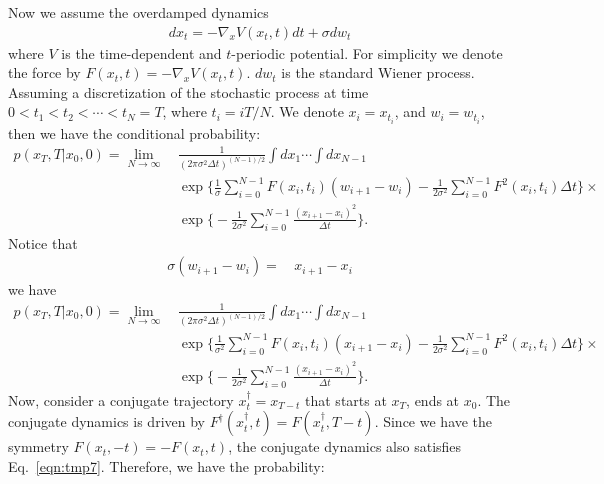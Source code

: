 \documentclass[preprint,unsortedaddress,a4paper,onecolumn]{revtex4-1}
\newcommand{\dt}[0]{\Delta t}
\begin{document}
Now we assume the overdamped dynamics
\begin{align}\label{eqn:tmp7}
  dx_t = -\nabla_x V(x_t,t) dt + \sigma dw_t
\end{align}
where $V$ is the time-dependent and $t$-periodic potential. For simplicity we denote the force by $F(x_t,t) = -\nabla_x V(x_t, t)$. $dw_t$ is
the standard Wiener process.  Assuming a discretization of the
stochastic process at time $0 < t_1 < t_2 < \cdots < t_N = T$, where
$t_i = iT / N$. We denote $x_i = x_{t_i}$, and $w_i = w_{t_i}$, then we have the
conditional probability:
\begin{align}\nonumber
  p(x_T,T\vert x_0,0) =\lim_{N\rightarrow\infty} &\,
  \frac{1}{(2\pi\sigma^2\dt)^{(N-1)/2}} \int dx_1\cdots\int dx_{N-1}\\\nonumber
  &\,
  \exp\bigg\{\frac1\sigma\sum_{i=0}^{N-1} F(x_i,t_i)(w_{i+1} - w_{i}) - \frac1{2\sigma^2}\sum_{i=0}^{N-1}F^2(x_i,t_i)\dt\bigg\} \times\\\label{eqn:tmp8}
  &\,
  \exp\bigg\{- \frac1{2\sigma^2} \sum_{i=0}^{N-1} \frac{(x_{i+1} - x_i)^2}{\dt}\bigg\}.
\end{align}
Notice that
\begin{align}\label{eqn:tmp10}
  \sigma(w_{i+1} - w_{i}) =
  &\,
  x_{i+1} - x_i 
\end{align}
we have
\begin{align}\nonumber
  p(x_T,T\vert x_0,0)
  =\lim_{N\rightarrow\infty} &\,
  \frac{1}{(2\pi\sigma^2\dt)^{(N-1)/2}} \int dx_1\cdots\int dx_{N-1}\\\nonumber
  &\,
  \exp\bigg\{\frac1{\sigma^2}\sum_{i=0}^{N-1} F(x_{i},t_{i})(x_{i+1} - x_i) -\frac1{2\sigma^2}\sum_{i=0}^{N-1}F^2(x_i,t_i)\dt\bigg\} \times\\\label{eqn:tmp10}
  &\,
  \exp\bigg\{- \frac1{2\sigma^2} \sum_{i=0}^{N-1} \frac{(x_{i+1} - x_i)^2}{\dt}\bigg\}.
\end{align}
Now, consider a conjugate trajectory $x^\dagger_t = x_{T-t}$ that starts at $x_T$, ends at $x_0$. The conjugate dynamics is driven by  $F^\dagger(x^\dagger_t,t) = F(x^\dagger_t, T-t)$.
Since we have the symmetry $F(x_t, -t) = -F(x_t, t)$, the conjugate dynamics also satisfies Eq.~\eqref{eqn:tmp7}.
Therefore, we have the probability:
\end{document}
